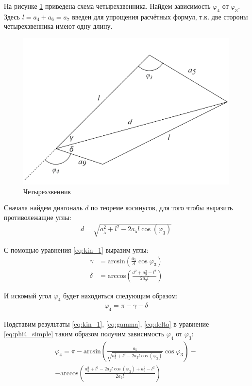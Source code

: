 На рисунке \ref{fig:scheme_four} приведена схема четырехзвенника. Найдем зависимость $ \varphi_4 $ от $ \varphi_3 $. Здесь $ l= a_4 + a_6=a_7 $ введен для упрощения расчётных формул, т.к. две стороны четырехзвенника имеют одну длину.
\begin{figure}[h]
    \centering
    \includegraphics[scale=1]{chapter_kinematics/figure4.png}
    \caption{Четырехзвенник}
    \label{fig:scheme_four}
\end{figure}

Сначала найдем диагональ $d$ по теореме косинусов, для того чтобы выразить противолежащие углы:
\begin{align}
    d = \sqrt{a_5^2 + l^2 - 2a_5 l \cos(\varphi_3)} \label{eq:kin_1}
\end{align}

\noindent С помощью уравнения \ref{eq:kin_1} выразим углы:
\begin{align}
    \gamma &= \text{arcsin}\left(\frac{a_5}{d}\cos \varphi_3\right) \label{eq:gamma} \\
    \delta &= \text{arccos}\left(\frac{d^2+a_9^2-l^2}{2 a_9 l}\right) \label{eq:delta}
\end{align}

\noindent И искомый угол $ \varphi_4 $ будет находиться следующим образом:
\begin{align}
    \varphi_4 = \pi - \gamma - \delta \label{eq:phi4_simple}
\end{align}

\noindent Подставим результаты \ref{eq:kin_1}, \ref{eq:gamma}, \ref{eq:delta} в уравнение \ref{eq:phi4_simple} таким образом получим  зависимость $ \varphi_4 $ от $ \varphi_3 $:
\begin{multline}
    \varphi_4 = \pi - \text{arcsin}\left(\frac{a_5}{\sqrt{a_5^2 + l^2 - 2a_5 l \cos(\varphi_3)}}\cos \varphi_3\right) - \\ - \text{arccos}\left(\frac{a_5^2 + l^2 - 2a_5 l \cos(\varphi_3)+a_9^2-l^2}{2 a_9 l}\right) 
\end{multline}

